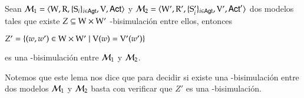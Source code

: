 \begin{lema}
    Sean $\mathcal{M}_1=\langle \mathrm{W},\mathrm{R},\{ \mathrm{S}_i \}_{i \in {\rm \sf Agt}},\mathrm{V},{\rm \sf Act} \rangle$ y 
    $\mathcal{M}_2=\langle \mathrm{W}',\mathrm{R}',\{ \mathrm{S}_i' \}_{i \in {\rm \sf Agt}},\mathrm{V}',{\rm \sf Act}' \rangle$ dos modelos 
    tales que existe $Z \subseteq \mathrm{W} \times \mathrm{W}'$ \KHilogic-bisimulación entre ellos, entonces

    \begin{center}
        $Z' = \{(w,w') \in \mathrm{W} \times \mathrm{W}' \mid \mathrm{V}(w) = \mathrm{V}'(w')\}$
    \end{center}
    es una \KHilogic-bisimulación entre $\mathcal{M}_1$ y $\mathcal{M}_2$.
\end{lema}

Notemos que este lema nos dice que para decidir si existe una \KHilogic-bisimulación
entre dos modelos $\mathcal{M}_1$ y $\mathcal{M}_2$ basta con verificar que $Z'$ es una \KHilogic-bisimulación.

